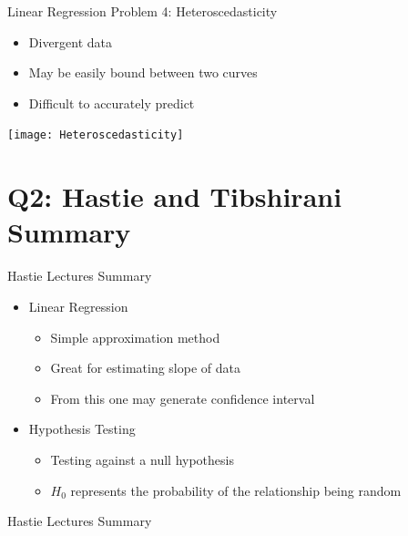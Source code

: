 \documentclass{beamer}
\begin{document}
\begin{frame}{Linear Regression Problem 4: Heteroscedasticity}
	\begin{itemize}
		\item Divergent data
		\item May be easily bound between two curves
		\item Difficult to accurately predict 
	\end{itemize}
	\centering
	\texttt{[image: Heteroscedasticity]}
\end{frame}

\section[Q2]{Q2: Hastie and Tibshirani Summary}

\begin{frame}{Hastie Lectures Summary}
	\begin{itemize}
		\item<1-> Linear Regression
		\begin{itemize}
			\item<1-> Simple approximation method
			\item<1-> Great for estimating slope of data
			\item<1-> From this one may generate confidence interval
		\end{itemize}
		\item<2> Hypothesis Testing
		\begin{itemize}
			\item<2> Testing against a null hypothesis
			\item<2>[] $H_0$ represents the probability of the relationship being random 
		\end{itemize}
	\end{itemize}
\end{frame}

\begin{frame}{Hastie Lectures Summary}
	
\end{frame}

\end{document}
